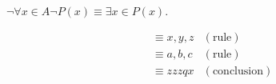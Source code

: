 
$\neg\forall x \in A \neg P(x) \equiv \exists x \in P(x).$

\begin{align*}
  &\equiv x,y,z &(\textrm{rule})\\
  &\equiv a,b,c &(\textrm{rule})\\
  &\equiv zzzqx &(\textrm{conclusion})
\end{align*}
